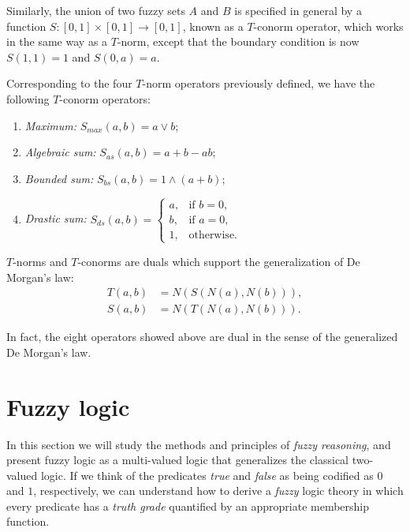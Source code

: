 \begin{definition} Similarly, the union of two fuzzy sets $A$ and $B$ is specified in general by a function $S:[0,1]\times [0,1] \to [0,1]$, known as a $T$-conorm operator, which works in the same way as a $T$-norm, except that the boundary condition is now $S(1,1) = 1$ and $S(0,a) = a$.

\end{definition}

Corresponding to the four $T$-norm operators previously defined, we have the following $T$-conorm operators:

\begin{enumerate}
	\item \textit{Maximum:} $S_{max}(a,b) = a \lor b$;
	\item \textit{Algebraic sum:} $S_{as}(a,b)=a + b - ab$;
	\item \textit{Bounded sum:} $S_{bs}(a,b) = 1 \land (a+b)$;
	\item \textit{Drastic sum:} $S_{ds}(a,b) = \begin{cases}
	                                      a, & \text{if } b = 0,\\
	                                      b, & \text{if } a = 0,\\
	                                      1, & \text{otherwise}.
                                          \end{cases}$
\end{enumerate}

\begin{theorem} $T$-norms and $T$-conorms are duals which support the generalization of De Morgan's law:
\begin{align*}
	T(a,b) &= N(S(N(a),N(b))),\\
	S(a,b) &= N(T(N(a), N(b))).
\end{align*}

\end{theorem}

In fact, the eight operators showed above are dual in the sense of the generalized De Morgan's law.

\section{Fuzzy logic}

In this section we will study the methods and principles of \textit{fuzzy reasoning}, and present fuzzy logic as a multi-valued logic that generalizes the classical two-valued logic. If we think of the predicates \textit{true} and \textit{false} as being codified as $0$ and $1$, respectively, we can understand how to derive a \textit{fuzzy} logic theory in which every predicate has a \textit{truth grade} quantified by an appropriate membership function.

